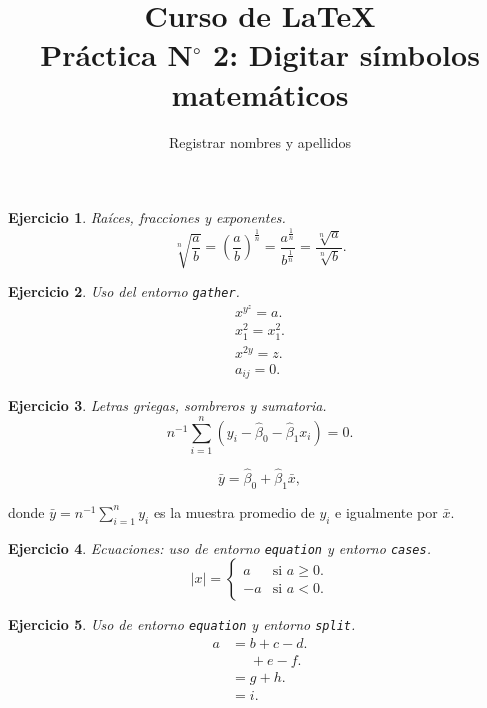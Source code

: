 \documentclass[12pt,a4paper]{article}
\author{Registrar nombres y apellidos}
\title{Curso de \LaTeX{}\\{\normalsize Práctica N$^{\circ}$ 2: Digitar símbolos matemáticos}}
\date{}
\newtheorem{ejer}{Ejercicio}
\begin{document}
\maketitle

\begin{ejer}
	Raíces, fracciones y exponentes.
	\begin{displaymath}
		\sqrt[n]{\frac{a}{b}}=
		{\left(\frac{a}{b}\right)}^{\frac{1}{n}}=
		\frac{a^{\frac{1}{n}}}{b^{\frac{1}{n}}}=
		\frac{\sqrt[n]{a}}{\sqrt[n]{b}}.
	\end{displaymath}
\end{ejer}

\begin{ejer}
	Uso del entorno \verb|gather|.
	\begin{gather}
		x^{y^{z}}=a.\\
		x^{2}_{1}=x^{2}_{1}.\\
		x^{2y}=z.\\
		a_{ij}=0.
	\end{gather}
\end{ejer}

\begin{ejer}
	Letras griegas, sombreros y sumatoria.
	\begin{displaymath}
		n^{-1}
		\sum^{n}_{i=1}
		\left(
		y_{i}-
		\hat{\beta}_{0}-
		\hat{\beta}_{1}x_{i}
		\right)=
		0.
	\end{displaymath}

	\begin{displaymath}
		\bar{y}=
		\hat{\beta}_{0}+
		\hat{\beta}_{1}
		\bar{x},
	\end{displaymath}
\end{ejer}
donde $\bar{y}=n^{-1}\sum^{n}_{i=1}y_{i}$ es la muestra promedio de
$y_{i}$ e igualmente por $\bar{x}$.

\begin{ejer}
	Ecuaciones: uso de entorno \verb|equation| y entorno \verb|cases|.
	\begin{equation*}
		\left|x\right| =
		\begin{cases}
			a  & \text{si $a\ge 0$}. \\
			-a & \text{si $a< 0$}.
		\end{cases}
	\end{equation*}
\end{ejer}

\begin{ejer}
	Uso de entorno \verb|equation| y entorno \verb|split|.
	\begin{equation}
		\begin{split}
			a & =b+c-d.          \\
			  & \phantom{=}+e-f. \\
			  & =g+h.            \\
			  & =i.
		\end{split}
	\end{equation}
\end{ejer}
\end{document}
